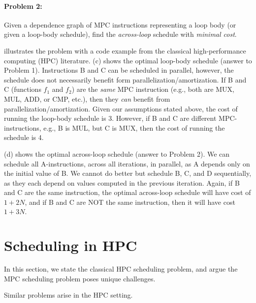 \documentclass[sigconf, screen, natbib=false, dvipsnames, table]{acmart}
\theoremstyle{definition}
\begin{document}
\paragraph{Problem 2:} Given a dependence graph of MPC instructions representing a loop body (or given a loop-body schedule), 
find the \emph{across-loop} schedule with  \emph{minimal cost}.

 illustrates the problem with a code example from the classical high-performance computing (HPC) literature. 
(c) shows the optimal loop-body schedule (answer to Problem 1). Instructions B and C can be scheduled in parallel, 
however, the schedule does not necessarily benefit form parallelization/amortization. If B and C (functions $f_1$ and $f_2$) are the \emph{same}
MPC instruction (e.g., both are MUX, MUL, ADD, or CMP, etc.), then they \emph{can} benefit from parallelization/amortization. Given
our assumptions stated above, the cost of running the loop-body schedule is 3. However, if B and C are different MPC-instructions,
e.g., B is MUL, but C is MUX, then the cost of running the schedule is 4. 

(d) shows the optimal across-loop schedule (answer to Problem 2). We can schedule all A-instructions, across all iterations, 
in parallel, as A depends only on the initial value of B. We cannot do better but schedule B, C, and D sequentially, as they each depend on values
computed in the previous iteration. Again, if B and C are the same instruction, the optimal across-loop schedule will have cost of $1 + 2N$, 
and if B and C are NOT the same instruction, then it will have cost $1+3N$.







\section{Scheduling in HPC}

In this section, we state the classical HPC scheduling problem, and argue the MPC scheduling problem poses unique challenges.

Similar problems arise in the HPC setting.
\end{document}
